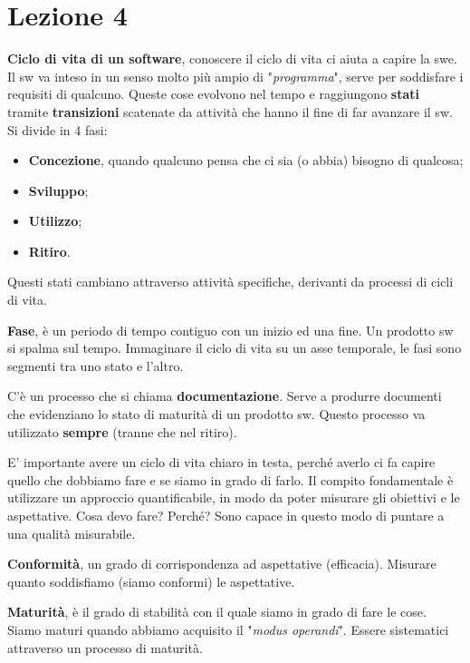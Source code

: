 




\section{Lezione 4}

\textbf{Ciclo di vita di un software}, conoscere il ciclo di vita ci aiuta a capire la swe. Il sw va inteso in un senso molto più ampio di "\textit{programma}", serve per soddisfare i requisiti di qualcuno. Queste cose evolvono nel tempo e raggiungono \textbf{stati} tramite \textbf{transizioni} scatenate da attività che hanno il fine di far avanzare il sw. Si divide in 4 fasi:

\begin{itemize}

	\item \textbf{Concezione}, quando qualcuno pensa che ci sia (o abbia) bisogno di qualcosa;
	\item \textbf{Sviluppo};
	\item \textbf{Utilizzo};
	\item \textbf{Ritiro}.

\end{itemize}

Questi stati cambiano attraverso attività specifiche, derivanti da processi di cicli di vita.

\textbf{Fase}, è un periodo di tempo contiguo con un inizio ed una fine. Un prodotto sw si spalma sul tempo. Immaginare il ciclo di vita su un asse temporale, le fasi sono segmenti tra uno stato e l'altro.

C'è un processo che si chiama \textbf{documentazione}. Serve a produrre documenti che evidenziano lo stato di maturità di un prodotto sw. Questo processo va utilizzato \textbf{sempre} (tranne che nel ritiro).

E' importante avere un ciclo di vita chiaro in testa, perché averlo ci fa capire quello che dobbiamo fare e se siamo in grado di farlo. Il compito fondamentale è utilizzare un approccio quantificabile, in modo da poter misurare gli obiettivi e le aspettative. Cosa devo fare? Perché? Sono capace in questo modo di puntare a una qualità misurabile.

\textbf{Conformità}, un grado di corrispondenza ad aspettative (efficacia). Misurare quanto soddisfiamo (siamo conformi) le aspettative.

\textbf{Maturità}, è il grado di stabilità con il quale siamo in grado di fare le cose. Siamo maturi quando abbiamo acquisito il "\textit{modus operandi}". Essere sistematici attraverso un processo di maturità.

